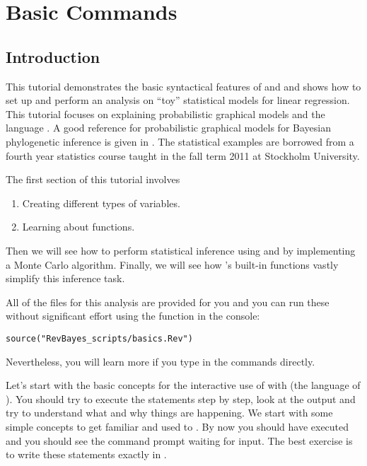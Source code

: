 \section{Basic \Rev Commands}

\subsection{Introduction}

This tutorial demonstrates the basic syntactical features of \RevBayes and \Rev and shows how to set up and perform an analysis on ``toy'' statistical models for linear regression. 
This tutorial focuses on explaining probabilistic graphical models and the language \Rev.
A good reference for probabilistic graphical models for Bayesian phylogenetic inference is given in \cite{Hohna2014b}.
The statistical examples are borrowed from a fourth year statistics course taught in the fall term 2011 at Stockholm University.

The first section of this tutorial involves 
\begin{enumerate}
\item Creating different types of variables.
\item Learning about functions. 
\end{enumerate}

Then we will see how to perform statistical inference using \RevBayes and \Rev  by implementing a Monte Carlo algorithm. 
Finally, we will see how \RevBayes 's built-in functions vastly simplify this inference task.

All of the files for this analysis are provided for you and you can run these without significant effort using the  function in the \RevBayes console:
{\tt \begin{snugshade*}
\begin{lstlisting}
source("RevBayes_scripts/basics.Rev")
\end{lstlisting}
\end{snugshade*}}
Nevertheless, you will learn more if you type in the commands directly.

Let's start with the basic concepts for the interactive use of \RevBayes with \Rev (the language of \RevBayes). 
You should try to execute the statements step by step, look at the output and try to understand what and why things are happening. 
We start with some simple concepts to get familiar and used to \RevBayes. 
By now you should have executed \RevBayes and you should see the command prompt waiting for input. 
The best exercise is to write these statements exactly in \RevBayes. 

